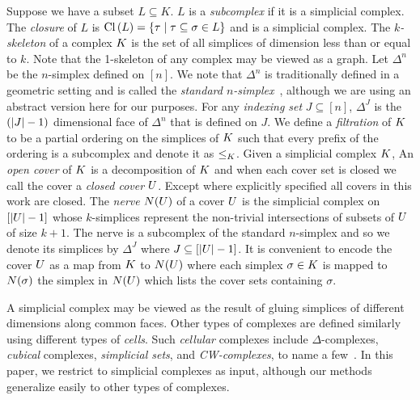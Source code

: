 \documentclass{elsarticle}
\begin{document}
Suppose we have a subset $L \subseteq K$.  $L$ is a \emph{subcomplex}
if it is a simplicial complex. The \emph{closure} of $L$ is 
$\operatorname{Cl}{(}L) = \{ \tau \mid \tau \subseteq \sigma \in L\}$ and is a simplicial complex. The 
\emph{$k$-skeleton} of a complex $K$ is the set of all simplices
of dimension less than or equal to $k$. Note that the 1-skeleton of
any complex may be viewed as a graph. 
Let $\Delta^n$ be the $n$-simplex defined on $[n]$.  We note that 
$\Delta^n$ is traditionally defined in a geometric setting and is 
called the \emph{standard $n$-simplex}~\cite{hatcher}, although we 
are using an abstract version here for our purposes. For any
\emph{indexing set} $J \subseteq [n]$, $\Delta^J$ is the $(|J|-1)$ 
dimensional face of $\Delta^n$  that is defined on $J$.
We define a \emph{filtration} of $K$ to be a partial ordering on the simplices of
$K$ such that every prefix of the ordering is a subcomplex and denote
it as $\leq_{K}$.
Given a simplicial complex $K$, An \emph{open cover}
of $K$ is a decomposition of $K$ and when each
cover set is closed we call the cover a \emph{closed cover} $U$. 
Except where explicitly specified all covers in this work are closed. The \emph{nerve} $N(U)$
of a cover $U$ is the simplicial complex on $[|U|-1]$ whose $k$-simplices 
represent the non-trivial intersections of subsets of $U$ of size $k+1$.
The nerve is a subcomplex of the standard $n$-simplex and so we 
denote its simplices by $\Delta^J$ where $J \subseteq [|U|-1]$. 
It is convenient to encode the cover $U$ as a map from $K$ to $N(U)$ where each 
simplex $\sigma \in K$ is mapped to $N(\sigma)$ the simplex in $N(U)$ which lists
the cover sets containing $\sigma$.

A simplicial complex may be viewed as the result of gluing simplices of 
different dimensions along common faces. Other types of complexes are defined 
similarly using different types of \emph{cells}. 
Such \emph{cellular} complexes include $\Delta$-complexes, \emph{cubical} 
complexes, \emph{simplicial sets}, and \emph{CW-complexes}, 
to name a few~\cite{ez-ssc-50,hatcher,kmm-ch-04,m-soat-68}.
In this paper, we restrict to simplicial complexes as input, although our 
methods generalize easily to other types of complexes. 
\end{document}
